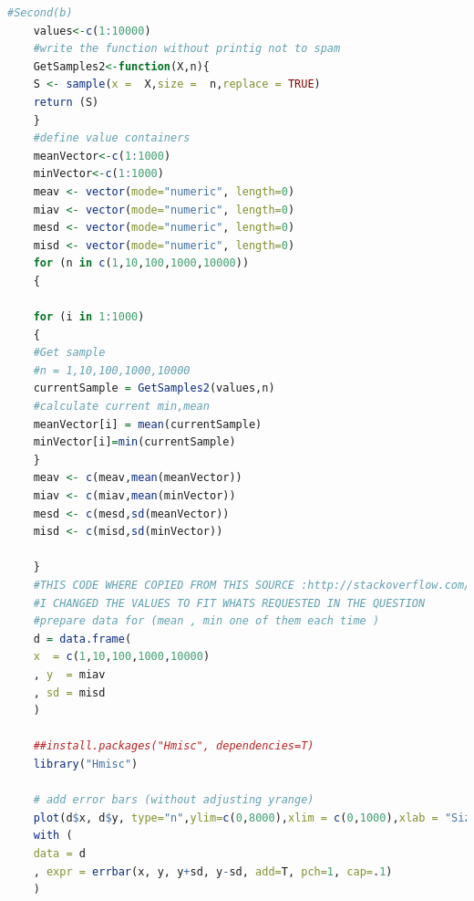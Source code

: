 \documentclass{article}
\begin{document}
	\begin{lstlisting}[language=R]
	#Second(b)
	values<-c(1:10000)
	#write the function without printig not to spam
	GetSamples2<-function(X,n){
	S <- sample(x =  X,size =  n,replace = TRUE)
	return (S)
	}
	#define value containers 
	meanVector<-c(1:1000)
	minVector<-c(1:1000)
	meav <- vector(mode="numeric", length=0)
	miav <- vector(mode="numeric", length=0)
	mesd <- vector(mode="numeric", length=0)
	misd <- vector(mode="numeric", length=0)
	for (n in c(1,10,100,1000,10000))
	{
	
	for (i in 1:1000)
	{
	#Get sample 
	#n = 1,10,100,1000,10000 
	currentSample = GetSamples2(values,n)
	#calculate current min,mean
	meanVector[i] = mean(currentSample)
	minVector[i]=min(currentSample)
	}
	meav <- c(meav,mean(meanVector))
	miav <- c(miav,mean(minVector))
	mesd <- c(mesd,sd(meanVector))
	misd <- c(misd,sd(minVector))
	
	}
	#THIS CODE WHERE COPIED FROM THIS SOURCE :http://stackoverflow.com/questions/15063287/add-error-bars-to-show-standard-deviation-on-a-plot-in-r
	#I CHANGED THE VALUES TO FIT WHATS REQUESTED IN THE QUESTION
	#prepare data for (mean , min one of them each time )
	d = data.frame(
	x  = c(1,10,100,1000,10000)
	, y  = miav
	, sd = misd
	)
	
	##install.packages("Hmisc", dependencies=T)
	library("Hmisc")
	
	# add error bars (without adjusting yrange)
	plot(d$x, d$y, type="n",ylim=c(0,8000),xlim = c(0,1000),xlab = "Size",ylab = "Average")
	with (
	data = d
	, expr = errbar(x, y, y+sd, y-sd, add=T, pch=1, cap=.1)
	)
	\end{lstlisting}
	
\end{document}
